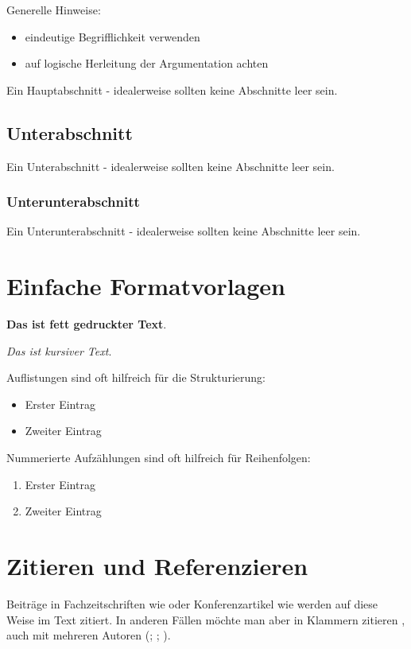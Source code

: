 \documentclass[12pt,oneside]{article}
\begin{document}
Generelle Hinweise:

\begin{itemize}
\item eindeutige Begrifflichkeit verwenden
\item auf logische Herleitung der Argumentation achten
\end{itemize}

Ein Hauptabschnitt - idealerweise sollten keine Abschnitte leer sein.

\subsection{Unterabschnitt}
Ein Unterabschnitt - idealerweise sollten keine Abschnitte leer sein.

\subsubsection{Unterunterabschnitt}
Ein Unterunterabschnitt - idealerweise sollten keine Abschnitte leer sein.

\section{Einfache Formatvorlagen}

\textbf{Das ist fett gedruckter Text}.

\textit{Das ist kursiver Text}.


Auflistungen sind oft hilfreich für die Strukturierung:
\begin{itemize}
    \item Erster Eintrag
    \item Zweiter Eintrag
\end{itemize}

Nummerierte Aufzählungen sind oft hilfreich für Reihenfolgen:
\begin{enumerate}
    \item Erster Eintrag
    \item Zweiter Eintrag
\end{enumerate}


\section{Zitieren und Referenzieren}

Beiträge in Fachzeitschriften wie \citet[12]{clemen1989combining} oder Konferenzartikel wie \citet[6]{he2017mask} werden auf diese Weise im Text zitiert. In anderen Fällen möchte man aber in Klammern zitieren \citep[10]{clemen1989combining}, auch mit mehreren Autoren (\citealp[3]{baumol1958warehouse}; \citealp[15]{clemen1989combining}; \citealp[12]{he2017mask}).
\end{document}
